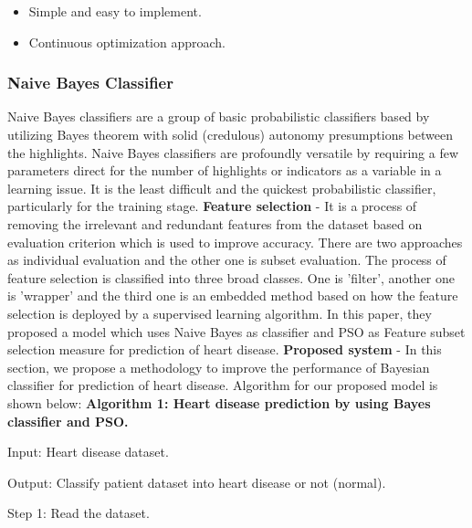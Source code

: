 \documentclass[oneside,12pt]{Classes/VTU}
\begin{document}
    \begin{itemize}
    	\item Simple and easy to implement.
    	\item Continuous optimization approach.
    \end{itemize}

    \subsubsection{Naive Bayes Classifier}
    Naive Bayes classifiers are a group of basic probabilistic classifiers based by utilizing Bayes theorem with solid (credulous) autonomy presumptions between the highlights. Naive Bayes classifiers are profoundly versatile by requiring a few parameters direct for the number of highlights or indicators as a variable in a learning issue. It is the least difficult and the quickest probabilistic classifier, particularly for the training stage.    
    \linebreak
    \linebreak                
    \textbf{Feature selection} - It is a process of removing the irrelevant and redundant features from the dataset based on evaluation criterion which is used to improve accuracy. There are two approaches as individual evaluation and the other one is subset evaluation. The process of feature selection is classified into three broad classes. One is 'filter', another one is 'wrapper' and the third one is an embedded method based on how the feature selection is deployed by a supervised learning algorithm. In this paper, they proposed a model which uses Naive Bayes as classifier and PSO as Feature subset selection measure for prediction of heart disease.
    \linebreak
    \linebreak                
    \textbf{Proposed system} - In this section, we propose a methodology to improve the performance of Bayesian classifier for prediction of heart disease. Algorithm for our proposed model is shown below:
    \linebreak
    \linebreak
    \textbf{Algorithm 1: Heart disease prediction by using Bayes classifier and PSO.}
    
    Input: Heart disease dataset.
    
    Output: Classify patient dataset into heart disease or not (normal).
    
    Step 1: Read the dataset.
    
\end{document}
